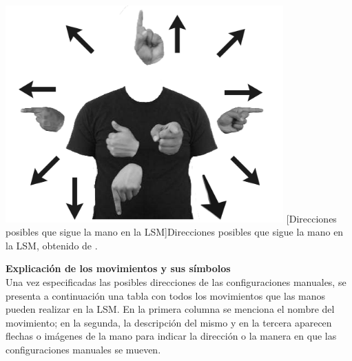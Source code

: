 \begin{center}
    \includegraphics[width=0.8\textwidth]{Images/Cap 2/Direccion_Manos_LSM.png}
    [Direcciones posibles que sigue la mano en la LSM]{Direcciones posibles que sigue la mano en la LSM, obtenido de \cite{ref37}.} 
    \label{direcciones_Mano}
\end{center}

\textbf{Explicación de los movimientos y sus símbolos}\\
Una vez especificadas las posibles direcciones de las configuraciones manuales, se presenta a continuación una tabla con todos los movimientos que las manos pueden realizar en la LSM. En la primera columna se menciona el nombre del movimiento; en la segunda, la descripción del mismo y en la tercera aparecen flechas o imágenes de la mano para indicar la dirección o la manera en que las configuraciones manuales se mueven.\\

